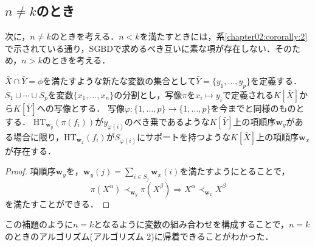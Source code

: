 \subsection{$n \ne k$のとき}
次に，$n \ne k$のときを考える．$n < k$を満たすときには，系\ref{chapter02:cororally:2}で示されている通り，SGBDで求めるべき互いに素な項が存在しない．そのため，$n > k$のときを考える．
\begin{lemma}
	$\bar{X} \cap \bar{Y} = \phi$を満たすような新たな変数の集合として$\bar{Y} = \{y_1, \dots, y_p\}$を定義する．
	$S_1 \cup \cdots \cup S_p$を変数$\{ x_1, \dots, x_n \}$の分割とし，写像$\pi$を$x_i \mapsto y_i$で定義される$K[\bar{X}]$から$K[\bar{Y}]$への写像とする．
写像$\varphi:\{1, \dots, p\} \to \{1, \dots, p\}$を今までと同様のものとする．
$\mathrm{HT}_{\bm{w}_y}(\pi(f_i))$が$y_{\varphi(i)}$のべき乗であるような$K[\bar{Y}]$上の項順序$\bm{w}_y$がある場合に限り，$\mathrm{HT}_{\bm{w}_x}(f_i)$が$S_{\varphi(i)}$にサポートを持つような$K[\bar{X}]$上の項順序$\bm{w}_x$が存在する．
\end{lemma}
\begin{proof}
	項順序$\bm{w}_y$を，$\displaystyle \bm{w}_y(j) = \sum_{i \in S_j}\bm{w}_x(i)$を満たすようにとることで，
	$$\pi(X^\alpha) \prec_{\bm{w}_y} \pi(X^\beta) \Longrightarrow X^\alpha \prec_{\bm{w}_x} X^\beta$$
	を満たすことができる．
\end{proof}
この補題のように$n = k$となるように変数の組み合わせを構成することで，$n = k$のときのアルゴリズム(アルゴリズム 2)に帰着できることがわかった．




















